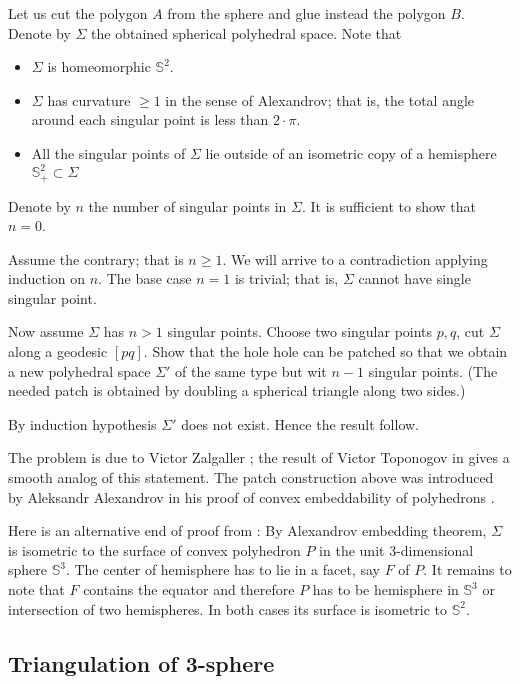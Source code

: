 Let us cut the polygon $A$ from the sphere and glue instead the polygon $B$.
Denote by $\Sigma$ the obtained spherical polyhedral space.
Note that 
\begin{itemize}
\item $\Sigma$ is homeomorphic $\mathbb S^2$.
\item $\Sigma$ has curvature $\ge 1$ in the sense of Alexandrov; that is, the total angle around each singular point is less than $2\cdot \pi$.
\item All the singular points of $\Sigma$ 
lie outside of an isometric copy of a hemisphere $\mathbb{S}^2_+\subset \Sigma$
\end{itemize}

Denote by $n$ the number of singular points in $\Sigma$.
It is sufficient to show that $n=0$.

Assume the contrary; that is $n\ge 1$.
We will arrive to a contradiction applying induction on $n$.
The base case $n=1$ is trivial; 
that is, $\Sigma$ cannot have single singular point.

Now assume $\Sigma$ has $n>1$ singular points.
Choose two singular points $p, q$,
cut $\Sigma$ along a geodesic $[pq]$.
Show that the hole hole can be patched so that we obtain a new polyhedral space $\Sigma'$ of the same type but wit $n-1$ singular points.
(The needed patch is obtained by doubling a
spherical triangle along two sides.)

By induction hypothesis $\Sigma'$ does not exist. Hence the result follow.
\qeds

The problem is due to Victor Zalgaller \cite[see][]{zalgaller-shperical-polygon};
the result of Victor Toponogov in \cite{toponogov} gives a smooth analog of this statement.
The patch construction above was introduced by 
Aleksandr Alexandrov
in his proof of convex embeddability of polyhedrons
\cite[see][VI, \S7]{alexandrov1948}.

Here is an alternative end of proof from \cite{panov-petrunin}:
By Alexandrov embedding theorem, $\Sigma$ is isometric to the surface of convex polyhedron $P$ in the unit 3-dimensional sphere $\mathbb S^3$. 
The center of hemisphere has to lie in a facet, say $F$ of $P$.
It remains to note that $F$ contains the equator and therefore $P$ has to be hemisphere in $\mathbb S^3$ or intersection of two hemispheres.
In both cases its surface is isometric to $\mathbb S^2$.


\subsection*{Triangulation of 3-sphere}

